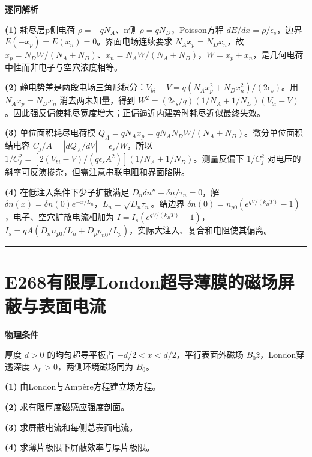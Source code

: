 \documentclass[UTF8,a4paper,11pt,oneside,openany]{ctexbook}
\begin{document}
\par\medskip\noindent\textbf{逐问解析}
\par\noindent\textbf{(1)} 耗尽层p侧电荷 \(\rho=-qN_A\)、n侧 \(\rho=qN_D\)，Poisson方程 \(dE/dx=\rho/\epsilon_s\)，边界 \(E(-x_p)=E(x_n)=0\)。界面电场连续要求 \(N_Ax_p=N_Dx_n\)，故 \(x_p=N_DW/(N_A+N_D)\)、\(x_n=N_AW/(N_A+N_D)\)，\(W=x_p+x_n\)，是几何电荷中性而非电子与空穴浓度相等。
\par\noindent\textbf{(2)} 静电势差是两段电场三角形积分：\(V_{bi}-V=q(N_Ax_p^2+N_Dx_n^2)/(2\epsilon_s)\)。用 \(N_Ax_p=N_Dx_n\) 消去两未知量，得到 \(W^2=(2\epsilon_s/q)(1/N_A+1/N_D)(V_{bi}-V)\)。因此强反偏使耗尽宽度增大；正偏逼近内建势时耗尽近似最终失效。
\par\noindent\textbf{(3)} 单位面积耗尽电荷模 \(Q_A=qN_Ax_p=qN_AN_DW/(N_A+N_D)\)。微分单位面积结电容 \(C_j/A=|dQ_A/dV|=\epsilon_s/W\)，所以 \(1/C_j^2=[2(V_{bi}-V)/(q\epsilon_sA^2)](1/N_A+1/N_D)\)。测量反偏下 \(1/C_j^2\) 对电压的斜率可反演掺杂，但需注意串联电阻和界面陷阱。
\par\noindent\textbf{(4)} 在低注入条件下少子扩散满足 \(D_n\delta n''-\delta n/\tau_n=0\)，解 \(\delta n(x)=\delta n(0)e^{-x/L_n}\)，\(L_n=\sqrt{D_n\tau_n}\)。结边界 \(\delta n(0)=n_{p0}(e^{qV/(k_BT)}-1)\)，电子、空穴扩散电流相加为 \(I=I_s(e^{qV/(k_BT)}-1)\)，\(I_s=qA(D_nn_{p0}/L_n+D_pp_{n0}/L_p)\)，实际大注入、复合和电阻使其偏离。

\par\bigskip\hrule\bigskip
\section*{E268\quad 有限厚London超导薄膜的磁场屏蔽与表面电流}
\textbf{物理条件}\par 厚度 \(d>0\) 的均匀超导平板占 \(-d/2<x<d/2\)，平行表面外磁场 \(B_0\hat z\)，London穿透深度 \(\lambda_L>0\)，两侧环境磁场同为 \(B_0\)。
\par\noindent\textbf{(1)} 由London与Ampère方程建立场方程。
\par\noindent\textbf{(2)} 求有限厚度磁感应强度剖面。
\par\noindent\textbf{(3)} 求屏蔽电流和每侧总表面电流。
\par\noindent\textbf{(4)} 求薄片极限下屏蔽效率与厚片极限。
\end{document}
